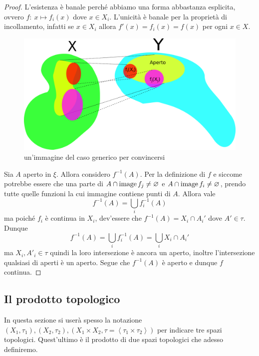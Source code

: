 \begin{proof}
	L'esistenza è banale perché abbiamo una forma abbastanza esplicita, ovvero $f \colon\ x \mapsto f_i(x)$ dove $x \in X_i$. L'unicità è banale per la proprietà di incollamento, infatti se $x \in X_i$ allora $f'(x) = f_i(x) = f(x)$ per ogni $x \in X$.
	
	\begin{figure}[h!]
		\centering
		\includegraphics[width=0.6\linewidth]{images/topologia_generale/Coomology_exercises_figure}
		\caption{un'immagine del caso generico per convincersi}
		\label{fig:coomologyexercisesfigure}
	\end{figure}

	Sia $A$ aperto in $\xi$. Allora considero $f^{-1}(A)$. Per la definizione di $f$ e siccome potrebbe essere che una parte di $A \cap \operatorname{image}{f_j} \neq \varnothing$ e $A \cap \operatorname{image}{f_i} \neq \varnothing$, prendo tutte quelle funzioni la cui immagine contiene punti di $A$. Allora vale 
	\begin{equation*}
		f^{-1}(A) = \bigcup_{i} f_i^{-1}(A) 
	\end{equation*}
	ma poiché $f_i$ è continua in $X_i$, dev'essere che $f^{-1}(A) = X_i \cap A_i'$ dove $A' \in \tau$. Dunque 
	\begin{equation*}
		f^{-1}(A) = \bigcup_{i} f_i^{-1}(A) = \bigcup_{i} X_i \cap A_i' 
	\end{equation*}
	ma $X_i, A'_i \in \tau$ quindi la loro intersezione è ancora un aperto, inoltre l'intersezione qualsiasi di aperti è un aperto. Segue che $f^{-1}(A)$ è aperto e dunque $f$ continua.
\end{proof}



\subsection{\textcolor{TopGener}{\textbf{Il prodotto topologico}}}



In questa sezione si userà spesso la notazione $(X_1, \tau_1), (X_2, \tau_2), (X_1 \times X_2, \tau = \left\langle\tau_1 \times \tau_2 \right\rangle)$ per indicare tre spazi topologici. Quest'ultimo è il prodotto di due spazi topologici che adesso definiremo.

